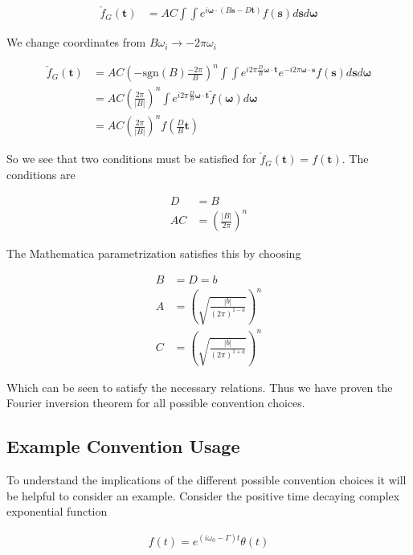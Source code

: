 \documentclass[12pt]{article}
\newcommand{\bv}[1]{\boldsymbol{#1}}
\begin{document}
\begin{align}
\check{f}_G(\bv{t}) &= AC \int \int e^{i\bv{\omega}\cdot(B \bv{s} - D \bv{t})} f(\bv{s}) d\bv{s} d\bv{\omega}
\end{align}

We change coordinates from $B \omega_i \rightarrow -2\pi \omega_i$

\begin{align}
\check{f}_G(\bv{t}) &= AC \left(-\text{sgn}(B)\frac{-2\pi}{B} \right)^n \int \int e^{i 2\pi \frac{D}{B} \bv{\omega}\cdot \bv{t}} e^{-i2\pi \bv{\omega}\cdot\bv{s}} f(\bv{s})d\bv{s}d\bv{\omega}\\
&= AC \left(\frac{2\pi}{|B|} \right)^n\int e^{i2\pi \frac{D}{B} \bv{\omega}\cdot\bv{t}} \tilde{f}(\bv{\omega})d\bv{\omega}\\
&= AC\left(\frac{2\pi}{|B|} \right)^n f\left(\frac{D}{B} \bv{t}\right)
\end{align}

So we see that two conditions must be satisfied for $\check{f}_G(\bv{t}) = f(\bv{t})$. The conditions are

\begin{align}
D&=B\\
AC &= \left(\frac{|B|}{2\pi}\right)^n
\end{align}

The Mathematica parametrization satisfies this by choosing

\begin{align}
B &= D = b\\
A &= \left(\sqrt{\frac{|b|}{(2\pi)^{1-a}}}\right)^n\\
C &= \left(\sqrt{\frac{|b|}{(2\pi)^{1+a}}}\right)^n
\end{align}

Which can be seen to satisfy the necessary relations. Thus we have proven the Fourier inversion theorem for all possible convention choices.

\subsection{Example Convention Usage}

To understand the implications of the different possible convention choices it will be helpful to consider an example. Consider the positive time decaying complex exponential function

\begin{align}
f(t) = e^{\left(i\omega_0 - \Gamma\right) t} \theta(t)
\end{align}
\end{document}
